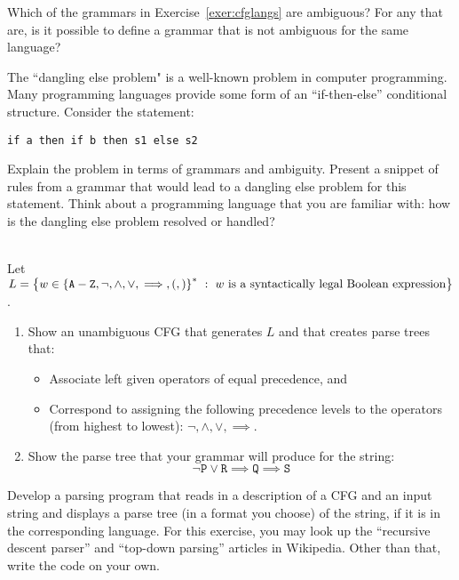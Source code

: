 \documentclass[twoside,letterpaper,openany]{book}
\begin{document}


\begin{exer}
Which of the grammars in Exercise~\ref{exer:cfglangs} are ambiguous? For any that are, is it possible to define a  grammar that is not ambiguous for the same language?
\end{exer}

\begin{exer}
The ``dangling else problem" is a well-known problem in computer programming. Many programming languages provide some form of an ``if-then-else'' conditional structure.  Consider the statement:
\begin{verbatim}
if a then if b then s1 else s2
\end{verbatim}
Explain the problem in terms of grammars and ambiguity. Present a snippet of rules from a grammar that would lead to a dangling else problem for this statement. Think about a programming language that you are familiar with: how is the dangling else problem resolved or handled?
\end{exer}

\begin{exer}\label{exer:cfgbools}
~\\Let  $L = \left\lbrace w \in \left\lbrace \texttt{A} - \texttt{Z}, \neg, \wedge, \vee, \implies, \left(, \right) \right\rbrace^{*}\ :\ w~\textrm{is a syntactically legal Boolean expression} \right\rbrace$.
\begin{enumerate}
\item Show an unambiguous CFG that generates $L$ and that creates parse trees that:
\begin{itemize}
\item Associate left given operators of equal precedence, and
\item Correspond to assigning the following precedence levels to the operators (from highest to lowest): $\neg, \wedge, \vee, \implies$.
\end{itemize}
\item Show the parse tree that your grammar will produce for the string:
\[ \neg\texttt{P}\vee\texttt{R}\implies\texttt{Q}\implies\texttt{S} \]
\end{enumerate}
\end{exer}

\begin{progexer}\happymac
Develop a parsing program that reads in a description of a CFG and an input string and displays a parse tree (in a format you choose) of the string, if it is in the corresponding language. For this exercise, you may look up the ``recursive descent parser'' and ``top-down parsing'' articles in Wikipedia. Other than that, write the code on your own.
\end{progexer}
\end{document}
